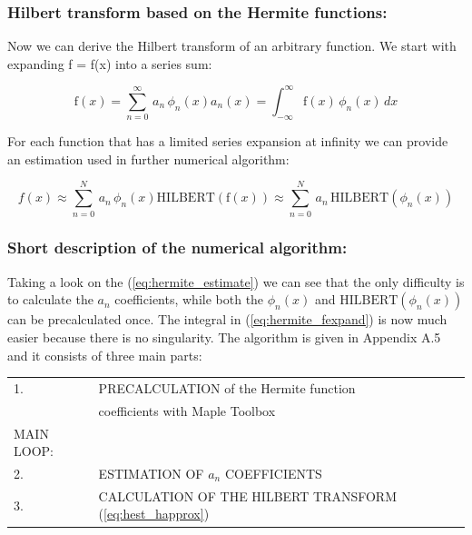 \documentclass[12pt,twoside,a4paper]{article}
\numberwithin{equation}{subsection}
\numberwithin{figure}{subsection}
\begin{document}
\subsubsection*{Hilbert transform based on the Hermite functions:}

Now we can derive the Hilbert transform of an arbitrary function. We start with expanding f = f(x) into a series sum:

\begin{subequations} \label{eq:hermite_fexpand}
  \begin{equation}   \label{eq:hfe_f}
     \mathrm{f}(x) = \sum_{n = 0}^{\infty } \, a_n \, \phi_n(x) 
  \end{equation}
  \begin{equation}   \label{eq:hfe_an}
     a_n(x) = \int_{ - \infty }^{\infty } \mathrm{f}(x) \, \phi_n (x) \, dx
  \end{equation}
\end{subequations}

For each function that has a limited series expansion at infinity we can provide an estimation used in further numerical algorithm:

\begin{subequations} \label{eq:hermite_estimate}
  \begin{equation}   \label{eq:hest_fapprox}
      f(x) \approx \sum_{n = 0}^{N} \, a_n \, \phi_n (x)
  \end{equation}
  \begin{equation}   \label{eq:hest_happrox}
     \mathrm{HILBERT} (\mathrm{f}(x)) \approx \sum_{n = 0} ^ {N} \, a_n \, \mathrm{HILBERT}(\phi_n (x))
  \end{equation}
\end{subequations}

\subsubsection*{Short description of the numerical algorithm:}

Taking a look on the (\ref{eq:hermite_estimate}) we can see that the only difficulty is to calculate the $a_n$ coefficients,
while both the $\phi_n (x)$ and $\mathrm{HILBERT}(\phi_n (x))$ can be precalculated once. The integral in
(\ref{eq:hermite_fexpand}) is now much easier because there is no singularity. The algorithm is given in Appendix A.5 and it
consists of three main parts:

\begin{tabular}{l l}
  1.         & PRECALCULATION of the Hermite function \\
             & coefficients with Maple Toolbox \\
  MAIN LOOP: & \\
  2.         & ESTIMATION OF ${a_{n}}$ COEFFICIENTS \\
  3.         & CALCULATION OF THE HILBERT TRANSFORM (\ref{eq:hest_happrox}) \\
\end{tabular}
\end{document}
